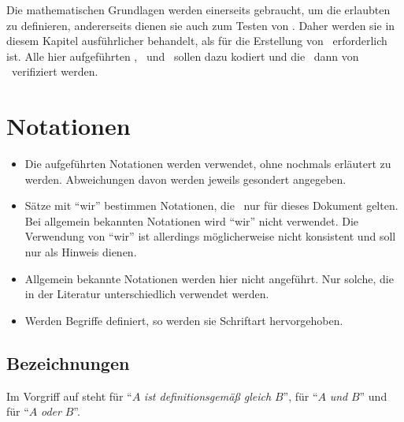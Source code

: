Die mathematischen Grundlagen werden einerseits gebraucht, um die erlaubten \Beweisschritte{} zu definieren, andererseits dienen sie auch zum Testen von \ASBA.
Daher werden sie in diesem Kapitel ausführlicher behandelt, als für die Erstellung von \ASBA\ erforderlich ist.
Alle hier aufgeführten \Axiome, \Saetze\ und \Beweise\ sollen dazu kodiert und die \Beweise\ dann von \ASBA\ verifiziert werden.

\section{Notationen}%
\label{sec:Notationen}

\begin{itemize}
	\item Die  aufgeführten Notationen werden  verwendet, ohne nochmals erläutert zu werden. Abweichungen davon werden jeweils gesondert angegeben.
	\item Sätze mit \enquote{wir} bestimmen Notationen, die \textevtl\ nur für dieses Dokument gelten.
	Bei allgemein bekannten Notationen wird \enquote{wir} nicht verwendet.
	Die Verwendung von \enquote{wir} ist allerdings möglicherweise nicht konsistent und soll nur als Hinweis dienen.
	\item Allgemein bekannte Notationen werden hier nicht angeführt.
	Nur solche, die in der Literatur unterschiedlich verwendet werden.
	\item Werden Begriffe definiert, so werden sie  Schriftart hervorgehoben.
\end{itemize}

\subsection{Bezeichnungen}%
\label{sub:Bezeichnungen}

Im Vorgriff auf  steht  für \enquote{$A$ \emph{ist definitionsgemäß gleich} $B$},  für \enquote{$A$ \emph{und} $B$} und  für \enquote{$A$ \emph{oder} $B$}.


